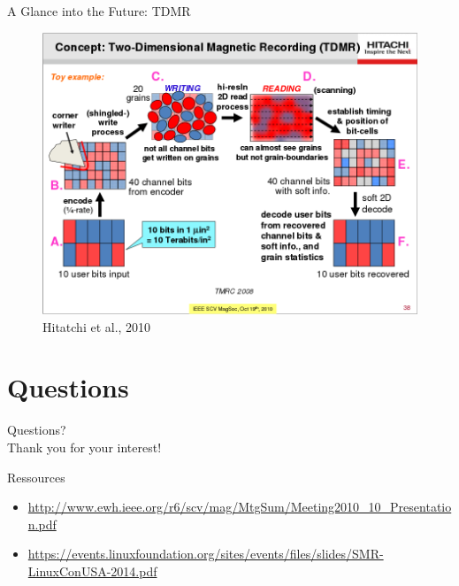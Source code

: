 \documentclass[12pt]{beamer}
\newlength{\wideitemsep}
\let\olditem\item
\renewcommand{\item}{\setlength{\itemsep}{\wideitemsep}\olditem}
\begin{document}
\begin{frame}[fragile]{A Glance into the Future: TDMR}
	\begin{figure}[p]
		\centering
		\includegraphics[width=0.85\linewidth]{img/hdd_2d_slides.png}
		\caption{Hitatchi et al., 2010}
	\end{figure}
\end{frame}

\section{Questions}
\begin{frame}[standout]
	Questions? \\
	Thank you for your interest!
\end{frame}

\begin{frame}[fragile]{Ressources}
	\begin{itemize}
		\item \url{http://www.ewh.ieee.org/r6/scv/mag/MtgSum/Meeting2010_10_Presentation.pdf}
		\item \url{https://events.linuxfoundation.org/sites/events/files/slides/SMR-LinuxConUSA-2014.pdf}
	\end{itemize}
\end{frame}
\end{document}
